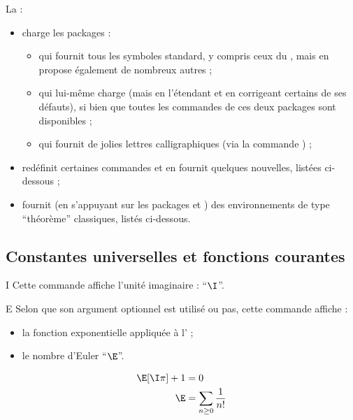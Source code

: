 \documentclass[english,nolocaltoc]{nwejmart}
\newtheorem[style=definition]{fait}
\newtheorem[title=expérience]{experience}
\newtheorem[title-plural=anneaux]{anneau}
\newtheorem[title=idéal,title-plural=idéaux]{ideal}
\begin{document}
La \nwejmauthorcl{} :
\begin{itemize}
\item charge les packages :
  \begin{itemize}
  \item {} qui fournit tous les symboles standard, y compris
    ceux du , mais en propose également de nombreux autres ;
  \item {} qui lui-même charge  (mais en
    l'étendant et en corrigeant certains de ses défauts), si bien que toutes les
    commandes de ces deux packages sont disponibles ;
  \item {} qui fournit de jolies lettres calligraphiques (via
    la commande ) ;
  \end{itemize}
\item redéfinit certaines commandes et en fournit quelques nouvelles, listées
  ci-dessous ;
\item fournit (en s'appuyant sur les packages  et
  ) des environnements de type \enquote{théorème} classiques,
  listés ci-dessous.
\end{itemize}

\subsection{Constantes universelles et fonctions courantes}

\begin{docCommand}{I}{}
  Cette commande affiche l'unité imaginaire : \enquote{$\I$}.
\end{docCommand}

\begin{docCommand}{E}{}
 Selon que son argument optionnel est utilisé ou pas, cette commande affiche :
  \begin{itemize}
  \item la fonction exponentielle appliquée à l' ;
  \item le nombre d'Euler \enquote{$\E$}.
  \end{itemize}
\end{docCommand}

\begin{bodycode}
\begin{align}
  \E[\I\pi]+1 & = 0 \\
  \E          & = \sum_{n\geq 0} \frac{1}{n!}
\end{align}
\end{bodycode}
\end{document}
